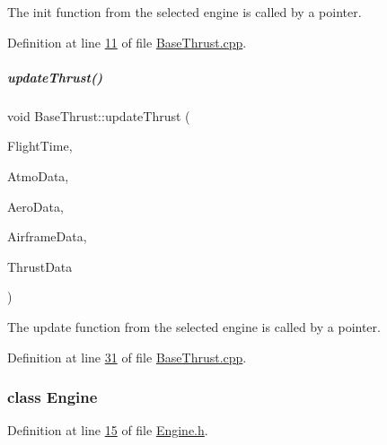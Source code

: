 The init function from the selected engine is called by a pointer. 

Definition at line \hyperlink{_base_thrust_8cpp_source_l00011}{11} of file \hyperlink{_base_thrust_8cpp_source}{Base\+Thrust.\+cpp}.

\mbox{\label{group___engine_a869359a1b2b7cddcbe5979d6a1cf5eac}} 
\subparagraph{\texorpdfstring{update\+Thrust()}{updateThrust()}}
{\footnotesize\ttfamily void Base\+Thrust\+::update\+Thrust (\begin{DoxyParamCaption}\item[{Float64}]{Flight\+Time,  }\item[{Atmosphere\+Struct \&}]{Atmo\+Data,  }\item[{Aerodynamic\+Struct \&}]{Aero\+Data,  }\item[{Airframe\+Struct \&}]{Airframe\+Data,  }\item[{Thrust\+Struct \&}]{Thrust\+Data }\end{DoxyParamCaption})}

The update function from the selected engine is called by a pointer. 

Definition at line \hyperlink{_base_thrust_8cpp_source_l00031}{31} of file \hyperlink{_base_thrust_8cpp_source}{Base\+Thrust.\+cpp}.

\label{class_engine}
\subsubsection{class Engine}


Definition at line \hyperlink{_engine_8h_source_l00015}{15} of file \hyperlink{_engine_8h_source}{Engine.\+h}.

